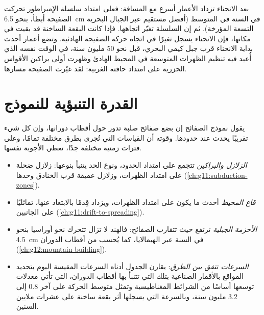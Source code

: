 بعد الانحناء تزداد الأعمار أسرع مع المسافة: فعلى امتداد سلسلة
الإمبراطور تحركت الصفيحة أبطأ، بنحو \qty{6.5}{cm} في السنة في المتوسط
(أفضل مستقيم عبر الجبال البحرية التسعة المؤرخة). ثم إن السلسلة تغيّر
اتجاهها. فإذا كانت البقعة الساخنة قد بقيت في مكانها، فإن الانحناء يسجل تغيرًا في
اتجاه حركة الصفيحة الهادئية. وتضع أعمار أحدث
بداية الانحناء قرب جبل كيمي البحري، قبل نحو 50 مليون
سنة، في الوقت نفسه الذي أُعيد فيه تنظيم الظهرات المتوسعة في
المحيط الهادئ وظهرت أولى براكين الأقواس الجزرية على امتداد حافته الغربية:
لقد غيّرت الصفيحة مسارها.

\section{القدرة التنبؤية للنموذج}\label{sec:g11:plate-motions:predictive}

يقول نموذج الصفائح إن بضع صفائح صلبة تدور حول أقطاب دورانها،
وإن كل شيء تقريبًا يحدث عند حدودها. وقوته أن
القياسات التي تُجرى بطرق مختلفة تمامًا، وعلى فترات زمنية مختلفة جدًا،
تعطي الأجوبة نفسها.

\begin{itemize}
  \item \emph{الزلازل والبراكين} تتجمع على امتداد الحدود، ونوع
        الحد يتنبأ بنوعها: زلازل ضحلة على امتداد
        الظهرات، وزلازل عميقة قرب الخنادق وحدها (\cref{ch:g11:subduction-zones}).
  \item \emph{قاع المحيط} أحدث ما يكون على امتداد الظهرات، ويزداد قِدمًا
        بالابتعاد عنها، تماثليًا على الجانبين
        (\cref{ch:g11:drift-to-spreading}).
  \item \emph{الأحزمة الجبلية} ترتفع حيث تتقارب الصفائح: فالهند لا تزال تتحرك
        نحو أوراسيا بنحو \qty{4.5}{cm} في السنة عبر الهيمالايا،
        كما يُحسب من أقطاب الدوران (\cref{ch:g12:mountain-building}).
  \item \emph{السرعات تتفق بين الطرق}: يقارن الجدول أدناه
        السرعات المقيسة اليوم بتحديد المواقع بالأقمار الصناعية بتلك التي تتنبأ
        بها أقطاب الدوران، التي تأتي معدلات توسعها أساسًا من
        الشرائط المغناطيسية وتمثل متوسط الحركة على آخر
        \num{0.8} إلى \num{3.2} مليون سنة، وبالسرعة التي يسجلها
        أثر بقعة ساخنة على عشرات ملايين السنين.
\end{itemize}

